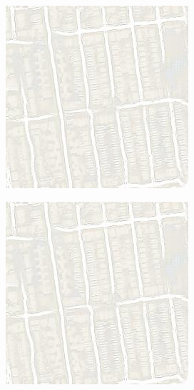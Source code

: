 \begin{figure}[ht]
  \medskip

  \begin{subfigure}[t]{.14\textwidth}
    \centering
    \includegraphics[width=\linewidth]{images/cycleGanResults/Maps19Ld120_E100_Lr0002.jpg}
  \end{subfigure}
  \begin{subfigure}[t]{.14\textwidth}
    \centering
    \includegraphics[width=\linewidth]{images/cycleGanResults/Maps19Ld120_E100_Lr0002.jpg}

\end{subfigure}
\end{figure}
